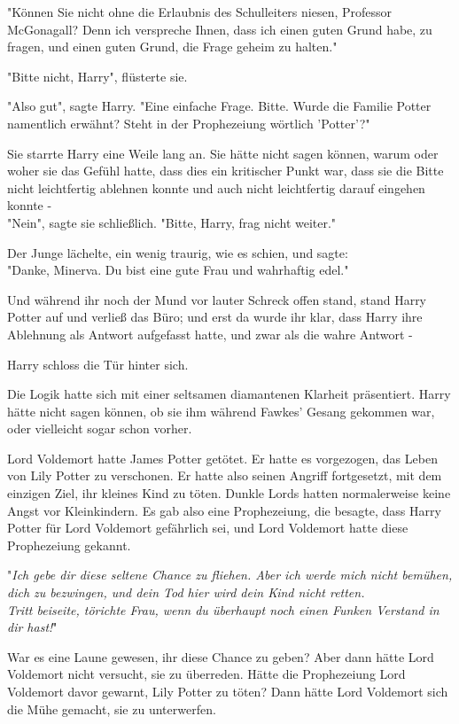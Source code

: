 {"Können Sie nicht ohne die Erlaubnis des Schulleiters niesen, Professor McGonagall? Denn ich verspreche Ihnen, dass ich einen guten Grund habe, zu fragen, und einen guten Grund, die Frage geheim zu halten."

"Bitte nicht, Harry", flüsterte sie.

"Also gut", sagte Harry. "Eine einfache Frage. Bitte. Wurde die Familie Potter namentlich erwähnt? Steht in der Prophezeiung wörtlich 'Potter'?"

Sie starrte Harry eine Weile lang an. Sie hätte nicht sagen können, warum oder woher sie das Gefühl hatte, dass dies ein kritischer Punkt war, dass sie die Bitte nicht leichtfertig ablehnen konnte und auch nicht leichtfertig darauf eingehen konnte -\\ "Nein", sagte sie schließlich. "Bitte, Harry, frag nicht weiter."

Der Junge lächelte, ein wenig traurig, wie es schien, und sagte:\\ "Danke, Minerva. Du bist eine gute Frau und wahrhaftig edel."

Und während ihr noch der Mund vor lauter Schreck offen stand, stand Harry Potter auf und verließ das Büro; und erst da wurde ihr klar, dass Harry ihre Ablehnung als Antwort aufgefasst hatte, und zwar als die wahre Antwort -

Harry schloss die Tür hinter sich.

Die Logik hatte sich mit einer seltsamen diamantenen Klarheit präsentiert. Harry hätte nicht sagen können, ob sie ihm während Fawkes' Gesang gekommen war, oder vielleicht sogar schon vorher.

Lord Voldemort hatte James Potter getötet. Er hatte es vorgezogen, das Leben von Lily Potter zu verschonen. Er hatte also seinen Angriff fortgesetzt, mit dem einzigen Ziel, ihr kleines Kind zu töten. Dunkle Lords hatten normalerweise keine Angst vor Kleinkindern. Es gab also eine Prophezeiung, die besagte, dass Harry Potter für Lord Voldemort gefährlich sei, und Lord Voldemort hatte diese Prophezeiung gekannt.

"\emph{Ich gebe dir diese seltene Chance zu fliehen. Aber ich werde mich nicht bemühen, dich zu bezwingen, und dein Tod hier wird dein Kind nicht retten.\\ Tritt beiseite, törichte Frau, wenn du überhaupt noch einen Funken Verstand in dir hast!}"

War es eine Laune gewesen, ihr diese Chance zu geben? Aber dann hätte Lord Voldemort nicht versucht, sie zu überreden. Hätte die Prophezeiung Lord Voldemort davor gewarnt, Lily Potter zu töten? Dann hätte Lord Voldemort sich die Mühe gemacht, sie zu unterwerfen.

}
